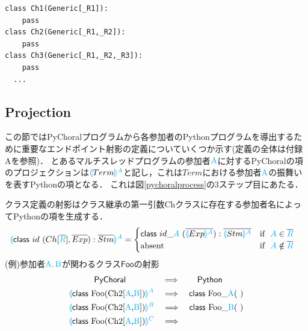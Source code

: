 \documentclass{thesis}
\newcommand{\projection}[2]{{\color{cyan}\llparenthesis}#1{\color{cyan}\rrparenthesis^#2}}
\newcommand{\cyan}[1]{\color{cyan}#1}
\begin{document}
\begin{lstlisting}[caption=Choreographyクラス,label=ch]
class Ch1(Generic[_R1]):
    pass
class Ch2(Generic[_R1,_R2]):
    pass
class Ch3(Generic[_R1,_R2,_R3]):
    pass
  ... 
\end{lstlisting}


\subsection{Projection}
この節ではPyChoralプログラムから各参加者のPythonプログラムを導出するために重要なエンドポイント射影の定義についていくつか示す(定義の全体は付録Aを参照)．
とあるマルチスレッドプログラムの参加者$\cyan{\text{A}}$に対するPyChoralの項のプロジェクションは$\projection{Term}{A}$と記し，これは$Term$における参加者$\cyan{\text{A}}$の振舞いを表すPythonの項となる．
これは図\ref{pychoralprocess}の3ステップ目にあたる．

クラス定義の射影はクラス継承の第一引数Chクラスに存在する参加者名によってPythonの項を生成する．
\begin{alignat*}{2} 
  &\projection{\textsf{class} ~id~(Ch[\overline{\cyan{R}}],\overline{Exp}):\overline{Stm}}{A}=
  \begin{cases}
    \textsf{class} ~id\_{\cyan{A}}~(\overline{\projection{Exp}{A}}):\overline{\projection{Stm}{A}} & \text{if}~~ {\cyan{A}} \in \overline{\cyan{R}}\\
    \text{absent} & \text{if}~~ {\cyan{A}} \notin \overline{\cyan{R}}
  \end{cases}
\end{alignat*}
(例)参加者$\cyan{\text{A}},\cyan{\text{B}}$が関わるクラス$\textsf{Foo}$の射影
\begin{alignat*}{2} 
  &~~~~~~~~~\textsf{PyChoral} ~~~~~~~~~~~~~\Longrightarrow~~~~~~ \textsf{Python}\\
  &\projection{\textsf{class} ~\text{Foo} \text{(Ch2[{\cyan{A}},{\cyan{B}}])}}{A} ~~~\Longrightarrow~~~ \textsf{class} ~\text{Foo\_{\cyan{A}}}(~)\\
  &\projection{\textsf{class} ~\text{Foo} \text{(Ch2[{\cyan{A}},{\cyan{B}}])}}{B} ~~~\Longrightarrow~~~ \textsf{class} ~\text{Foo\_{\cyan{B}}}(~)\\
  &\projection{\textsf{class} ~\text{Foo} \text{(Ch2[{\cyan{A}},{\cyan{B}}])}}{C} ~~~\Longrightarrow~~~ 
\end{alignat*}
\end{document}
